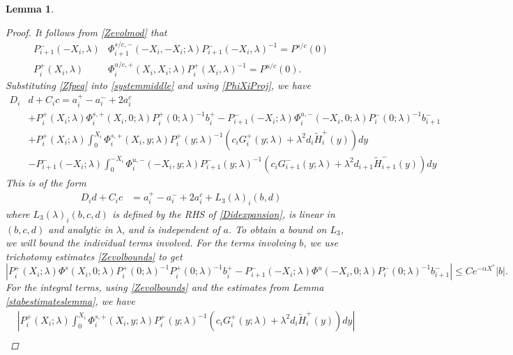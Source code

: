\documentclass[10pt,reqno]{amsart}
\theoremstyle{plain}
\newtheorem{lemma}[theorem]{Lemma}
\theoremstyle{definition}
\theoremstyle{remark}
\numberwithin{theorem}{section}
\numberwithin{equation}{section}
\begin{document}
\begin{lemma}
\begin{proof}
It follows from \cref{Zevolmod} that
\begin{equation}\label{PhiXiProj}
\begin{aligned}
P_{i+1}^-(-X_i, \lambda) &\Phi_{i+1}^{s/c,-}(-X_i, -X_i; \lambda) P_{i+1}^-(-X_i, \lambda)^{-1} = P^{s/c}(0) \\
P_i^+(X_i, \lambda) &\Phi^{u/c,+}_{i}(X_i, X_i; \lambda) P_i^+(X_i, \lambda)^{-1} = P^{u/c}(0).
\end{aligned}
\end{equation}
Substituting \cref{Zfpeq} into \cref{systemmiddle} and using \cref{PhiXiProj}, we have
\begin{equation}\label{Didexpansion}
\begin{aligned}
D_i &d + C_i c = a_i^+ - a_i^- + 2 a_i^c \\
&+ P_i^+(X_i; \lambda)\Phi_i^{s,+}(X_i, 0; \lambda) P_i^+(0; \lambda)^{-1} b_i^+ - P_{i+1}^-(-X_i; \lambda)\Phi_i^{u,-}(-X_i, 0; \lambda) P_i^-(0; \lambda)^{-1} b_{i+1}^- \\
&+ P_i^+(X_i; \lambda) \int_0^{X_i} \Phi_i^{s,+}(X_i, y; \lambda)P_i^+(y; \lambda)^{-1} (c_i G_i^+(y; \lambda) + \lambda^2 d_i \tilde{H}_i^+(y)) dy \\ 
&- P_{i+1}^-(-X_i; \lambda) \int_0^{-X_i} \Phi_i^{u,-}(-X_i, y; \lambda) P_{i+1}^-(y; \lambda)^{-1}(c_i G_{i+1}^-(y; \lambda) + \lambda^2 d_{i+1} \tilde{H}_{i+1}^-(y)) dy
\end{aligned}
\end{equation}
This is of the form
\begin{align}\label{Dideq1}
D_i d + C_i c &= a_i^+ - a_i^- + 2 a_i^c + L_3(\lambda)_i(b, d)
\end{align}
where $L_3(\lambda)_i(b, c, d)$ is defined by the RHS of \cref{Didexpansion}, is linear in $(b,c,d)$ and analytic in $\lambda$, and is independent of $a$. To obtain a bound on $L_3$, we will bound the individual terms involved. For the terms involving $b$, we use trichotomy estimates \eqref{Zevolbounds} to get
\[
| P_i^+(X_i; \lambda)\Phi^s(X_i, 0; \lambda) P_i^+(0; \lambda)^{-1} P_i^+(0; \lambda)^{-1} b_i^+ - P_{i+1}^-(-X_i; \lambda) \Phi^u(-X_i, 0; \lambda) P_i^-(0; \lambda)^{-1} b_{i+1}^-| \leq C e^{-\alpha X^*} |b|.
\]
For the integral terms, using \eqref{Zevolbounds} and the estimates from Lemma \ref{stabestimateslemma}, we have
\begin{align*}
&\left| P_i^+(X_i; \lambda) \int_0^{X_i} \Phi_i^{s,+}(X_i, y; \lambda)P_i^+(y; \lambda)^{-1} (c_i G_i^+(y; \lambda) + \lambda^2 d_i \tilde{H}_i^+(y)) dy \right| \\

\end{align*}
\end{proof}
\end{lemma}
\end{document}

